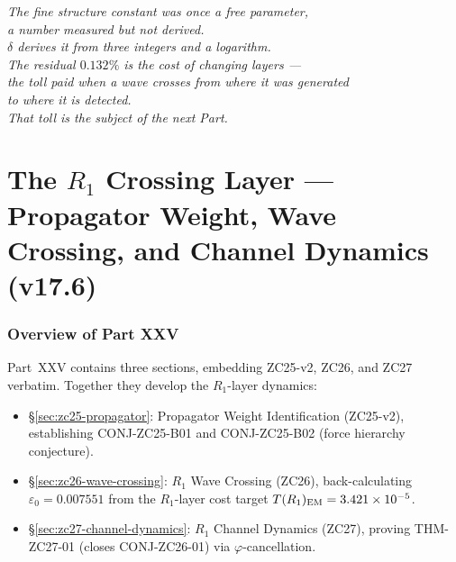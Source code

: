 \documentclass[12pt, a4paper]{article}
\begin{document}
\begin{center}
\textit{The fine structure constant was once a free parameter,\\
a number measured but not derived.\\
$\delta$ derives it from three integers and a logarithm.\\
The residual $0.132\%$ is the cost of changing layers ---\\
the toll paid when a wave crosses from where it was generated\\
to where it is detected.\\
That toll is the subject of the next Part.}
\end{center}


\part{The $R_1$ Crossing Layer --- Propagator Weight, Wave Crossing, and Channel Dynamics (v17.6)}
\label{part:XXV}

\section*{Overview of Part XXV}

Part~XXV contains three sections, embedding ZC25-v2, ZC26, and ZC27
verbatim. Together they develop the $R_1$-layer dynamics:

\begin{itemize}[leftmargin=2em]
\item \S\ref{sec:zc25-propagator}: Propagator Weight Identification
  (ZC25-v2), establishing CONJ-ZC25-B01 and CONJ-ZC25-B02
  (force hierarchy conjecture).
\item \S\ref{sec:zc26-wave-crossing}: $R_1$ Wave Crossing
  (ZC26), back-calculating $\varepsilon_0 = 0.007551$ from the
  $R_1$-layer cost target $T(R_1)_{\rm EM} = 3.421\times 10^{-5}$.
\item \S\ref{sec:zc27-channel-dynamics}: $R_1$ Channel Dynamics
  (ZC27), proving THM-ZC27-01 (closes CONJ-ZC26-01) via
  $\varphi$-cancellation.
\end{itemize}
\end{document}
